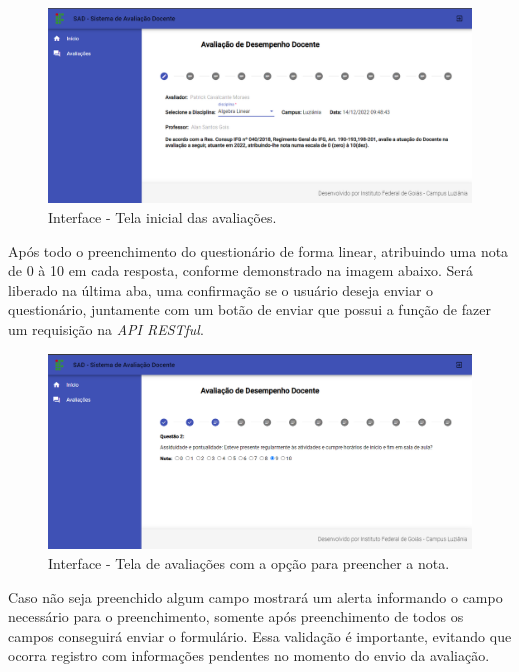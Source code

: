     
        \begin{figure}[h]
        \centering
        \includegraphics[width=1.0\textwidth]{./img/Avaliações.png}
        \caption{Interface - Tela inicial das avaliações.}
        \label{fig:InicialAv}
        \end{figure}
        
    Após todo o preenchimento do questionário de forma linear, atribuindo uma nota de 0 à 10 em cada resposta, conforme demonstrado na imagem abaixo. Será liberado na última aba, uma confirmação se o usuário deseja enviar o questionário, juntamente com um botão de enviar que possui a função de fazer um requisição na \textit{API RESTful}.  

        \begin{figure}[h]
        \centering
        \includegraphics[width=1.0\textwidth]{./img/AvaliaçõesNota.png}
        \caption{Interface - Tela de avaliações com a opção para preencher a nota.}
        \label{fig:Nota}
        \end{figure}

    Caso não seja preenchido algum campo mostrará um alerta informando o campo necessário para o preenchimento, somente após preenchimento de todos os campos conseguirá enviar o formulário. Essa validação é importante, evitando que ocorra registro com informações pendentes no momento do envio da avaliação.
   

